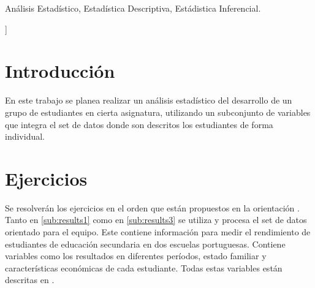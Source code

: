 \documentclass[a4paper,10pt,twocolumn]{article}
\begin{document}
\begin{topics}
	Análisis Estadístico, Estadística Descriptiva, Estádistica Inferencial.
\end{topics}


\vspace{0.8cm}
]



\section{Introducción}\label{sec:intro}
  En este trabajo se planea realizar un análisis estadístico del desarrollo de un grupo de estudiantes en cierta asignatura, utilizando un subconjunto de variables que integra el set de datos donde son descritos los estudiantes de forma individual.



\section{Ejercicios}\label{sec:dev}
  Se resolverán los ejercicios en el orden que están propuestos en la orientación \cite{1}.
  \\
  Tanto en \ref{sub:results1} como en \ref{sub:results3} se utiliza y procesa el set de datos orientado para el equipo. Este contiene información para medir el rendimiento de estudiantes de educación secundaria en dos escuelas portuguesas. Contiene variables como
  los resultados en diferentes períodos, estado familiar y características económicas de cada estudiante. Todas estas variables están descritas en \cite{artículo original}.
  
\end{document}
